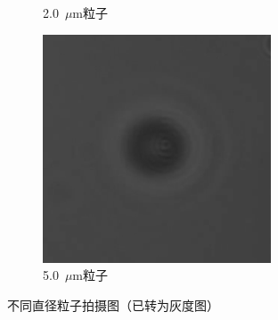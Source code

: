 \documentclass[a4paper]{report} %
\begin{document}
\begin{figure}[H]
\begin{subfigure}{0.3\textwidth}
        \caption{2.0~$\mu$m粒子}
    \end{subfigure}
    \begin{subfigure}{0.3\textwidth}
        \includegraphics[width=\linewidth]{5um.png}
        \caption{5.0~$\mu$m粒子}
    \end{subfigure}

    \caption{不同直径粒子拍摄图（已转为灰度图）}
\end{figure}



\end{document}
